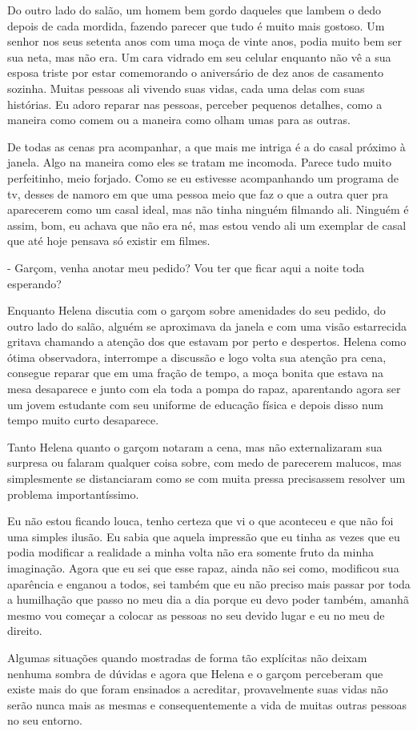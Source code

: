 Do outro lado do salão, um homem bem gordo daqueles que lambem o dedo depois de cada mordida, fazendo parecer que tudo é muito mais gostoso. Um senhor nos seus setenta anos com uma moça de vinte anos, podia muito bem ser sua neta, mas não era. Um cara vidrado em seu celular enquanto não vê a sua esposa triste por estar comemorando o aniversário de dez anos de casamento sozinha. Muitas pessoas ali vivendo suas vidas, cada uma delas com suas histórias. Eu adoro reparar nas pessoas, perceber pequenos detalhes, como a maneira como comem ou a maneira como olham umas para as outras. 

De todas as cenas pra acompanhar, a que mais me intriga é a do casal próximo à janela. Algo na maneira como eles se tratam me incomoda. Parece tudo muito perfeitinho, meio forjado. Como se eu estivesse acompanhando um programa de tv, desses de namoro em que uma pessoa meio que faz o que a outra quer pra aparecerem como um casal ideal, mas não tinha ninguém filmando ali. Ninguém é assim, bom, eu achava que não era né, mas estou vendo ali um exemplar de casal que até hoje pensava só existir em filmes.

- Garçom, venha anotar meu pedido? Vou ter que ficar aqui a noite toda esperando?

Enquanto Helena discutia com o garçom sobre amenidades do seu pedido, do outro lado do salão, alguém se aproximava da janela e com uma visão estarrecida gritava chamando a atenção dos que estavam por perto e despertos. Helena como ótima observadora, interrompe a discussão e logo volta sua atenção pra cena, consegue reparar que em uma fração de tempo, a moça bonita que estava na mesa  desaparece e junto com ela toda a pompa do rapaz, aparentando agora ser um jovem estudante com seu uniforme de educação física e depois disso num tempo muito curto desaparece.

Tanto Helena quanto o garçom notaram a cena, mas não externalizaram sua surpresa ou falaram qualquer coisa sobre, com medo de parecerem malucos, mas simplesmente se distanciaram como se com muita pressa precisassem resolver um problema importantíssimo.

Eu não estou ficando louca, tenho certeza que vi o que aconteceu e que não foi uma simples ilusão. Eu sabia que aquela impressão que eu tinha as vezes que eu podia modificar a realidade a minha volta não era somente fruto da minha imaginação. Agora que eu sei que esse rapaz, ainda não sei como, modificou sua aparência e enganou a todos, sei também que eu não preciso mais passar por toda a humilhação que passo no meu dia a dia porque eu devo poder também, amanhã mesmo vou começar a colocar as pessoas no seu devido lugar e eu no meu de direito.

Algumas situações quando mostradas de forma tão explícitas não deixam nenhuma sombra de dúvidas e agora que Helena e o garçom perceberam que existe mais do que foram ensinados a acreditar, provavelmente suas vidas não serão nunca mais as mesmas e consequentemente a vida de muitas outras pessoas no seu entorno. 


